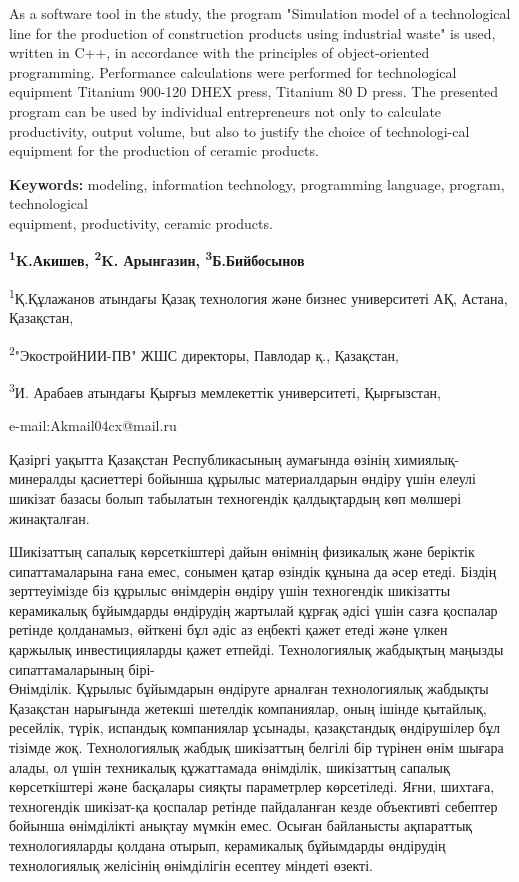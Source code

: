 As a software tool in the study, the program "Simulation model of a
technological line for the production of construction products using
industrial waste" is used, written in C++, in accordance with the
principles of object-oriented programming. Performance calculations were
performed for technological equipment Titanium 900-120 DHEX press,
Titanium 80 D press. The presented program can be used by individual
entrepreneurs not only to calculate productivity, output volume, but
also to justify the choice of technologi-cal equipment for the production
of ceramic products.

{\bfseries Keywords:} modeling, information technology, programming
language, program, technological \\equipment, productivity, ceramic
products.


\begin{center}
{\bfseries \textsuperscript{1}K.Акишев\envelope,
\textsuperscript{2}K. Арынгазин, \textsuperscript{3}Б.Бийбосынов}

\textsuperscript{1}Қ.Құлажанов атындағы Қазақ технология және бизнес
университеті АҚ, Астана, Қазақстан,

\textsuperscript{2}"ЭкостройНИИ-ПВ" ЖШС директоры, Павлодар қ.,
Қазақстан,

\textsuperscript{3}И. Арабаев атындағы Қырғыз мемлекеттік университеті,
Қырғызстан,

e-mail:Akmail04cx@mail.ru
\end{center}

Қазіргі уақытта Қазақстан Республикасының аумағында өзінің
химиялық-минералды қасиеттері бойынша құрылыс материалдарын өндіру үшін
елеулі шикізат базасы болып табылатын техногендік қалдықтардың көп
мөлшері жинақталған.

Шикізаттың сапалық көрсеткіштері дайын өнімнің физикалық және беріктік
сипаттамаларына ғана емес, сонымен қатар өзіндік құнына да әсер етеді.
Біздің зерттеуімізде біз құрылыс өнімдерін өндіру үшін техногендік
шикізатты керамикалық бұйымдарды өндірудің жартылай құрғақ әдісі үшін
сазға қоспалар ретінде қолданамыз, өйткені бұл әдіс аз еңбекті қажет
етеді және үлкен қаржылық инвестицияларды қажет етпейді. Технологиялық
жабдықтың маңызды сипаттамаларының бірі-\\Өнімділік. Құрылыс бұйымдарын
өндіруге арналған технологиялық жабдықты Қазақстан нарығында жетекші
шетелдік компаниялар, оның ішінде қытайлық, ресейлік, түрік, испандық
компаниялар ұсынады, қазақстандық өндірушілер бұл тізімде жоқ.
Технологиялық жабдық шикізаттың белгілі бір түрінен өнім шығара алады,
ол үшін техникалық құжаттамада өнімділік, шикізаттың сапалық
көрсеткіштері және басқалары сияқты параметрлер көрсетіледі. Яғни,
шихтаға, техногендік шикізат-қа қоспалар ретінде пайдаланған кезде
объективті себептер бойынша өнімділікті анықтау мүмкін емес. Осыған
байланысты ақпараттық технологияларды қолдана отырып, керамикалық
бұйымдарды өндірудің технологиялық желісінің өнімділігін есептеу міндеті
өзекті.


